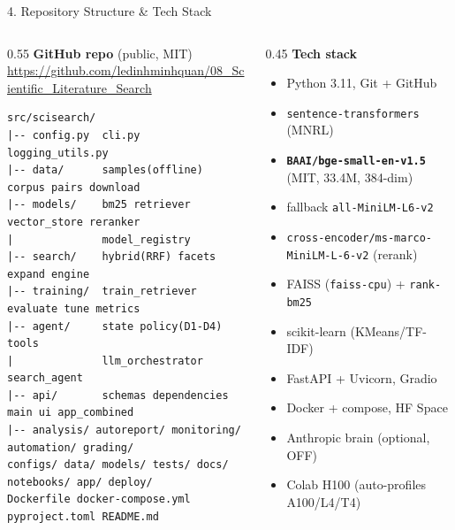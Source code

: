 \documentclass[10pt,aspectratio=169]{beamer}
\begin{document}
\begin{frame}[fragile]{4. Repository Structure \& Tech Stack}
\begin{columns}[T]
\begin{column}{0.55\textwidth}
\textbf{GitHub repo} (public, MIT) \\
\scriptsize \url{https://github.com/ledinhminhquan/08_Scientific_Literature_Search}

\vspace{0.15cm}
\begin{lstlisting}[basicstyle=\ttfamily\tiny]
src/scisearch/
|-- config.py  cli.py  logging_utils.py
|-- data/      samples(offline) corpus pairs download
|-- models/    bm25 retriever vector_store reranker
|              model_registry
|-- search/    hybrid(RRF) facets expand engine
|-- training/  train_retriever evaluate tune metrics
|-- agent/     state policy(D1-D4) tools
|              llm_orchestrator search_agent
|-- api/       schemas dependencies main ui app_combined
|-- analysis/ autoreport/ monitoring/ automation/ grading/
configs/ data/ models/ tests/ docs/ notebooks/ app/ deploy/
Dockerfile docker-compose.yml pyproject.toml README.md
\end{lstlisting}
\end{column}
\begin{column}{0.45\textwidth}
\textbf{Tech stack}
\begin{itemize}\scriptsize
  \item Python 3.11, Git + GitHub
  \item \texttt{sentence-transformers} (MNRL)
  \item \textbf{\texttt{BAAI/bge-small-en-v1.5}} (MIT, 33.4M, 384-dim)
  \item fallback \texttt{all-MiniLM-L6-v2}
  \item \texttt{cross-encoder/ms-marco-MiniLM-L-6-v2} (rerank)
  \item FAISS (\texttt{faiss-cpu}) + \texttt{rank-bm25}
  \item scikit-learn (KMeans/TF-IDF)
  \item FastAPI + Uvicorn, Gradio
  \item Docker + compose, HF Space
  \item Anthropic brain (optional, OFF)
  \item Colab H100 (auto-profiles A100/L4/T4)
\end{itemize}
\end{column}
\end{columns}
\end{frame}
\end{document}
